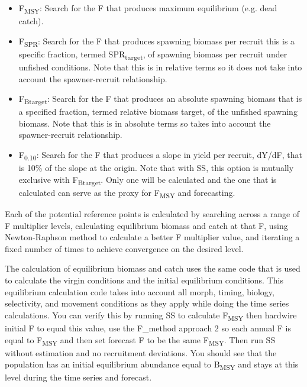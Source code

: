 \begin{itemize}
	\item F\textsubscript{MSY}: Search for the F that produces maximum equilibrium (e.g. dead catch).
	
	\item F\textsubscript{SPR}: Search for the F that produces spawning biomass per recruit this is a specific fraction, termed SPR\textsubscript{target}, of spawning biomass per recruit under unfished conditions. Note that this is in relative terms so it does not take into account the spawner-recruit relationship.
	
	\item F\textsubscript{Btarget}: Search for the F that produces an absolute spawning biomass that is a specified fraction, termed relative biomass target, of the unfished spawning biomass. Note that this is in absolute terms so takes into account the spawner-recruit relationship. 
	
	\item F\textsubscript{0.10}: Search for the F that produces a slope in yield per recruit, dY/dF, that is 10\% of the slope at the origin. Note that with SS, this option is mutually exclusive with F\textsubscript{Btarget}. Only one will be calculated and the one that is calculated can serve as the proxy for F\textsubscript{MSY} and forecasting.
\end{itemize}

Each of the potential reference points is calculated by searching across a range of F multiplier levels, calculating equilibrium biomass and catch at that F, using Newton-Raphson method to calculate a better F multiplier value, and iterating a fixed number of times to achieve convergence on the desired level.

The calculation of equilibrium biomass and catch uses the same code that is used to calculate the virgin conditions and the initial equilibrium conditions.  This equilibrium calculation code takes into account all morph, timing, biology, selectivity, and movement conditions as they apply while doing the time series calculations.  You can verify this by running SS to calculate F\textsubscript{MSY} then hardwire initial F to equal this value, use the F\_method approach 2 so each annual F is equal to F\textsubscript{MSY} and then set forecast F to be the same F\textsubscript{MSY}.  Then run SS without estimation and no recruitment deviations.  You should see that the population has an initial equilibrium abundance equal to B\textsubscript{MSY} and stays at this level during the time series and forecast.

